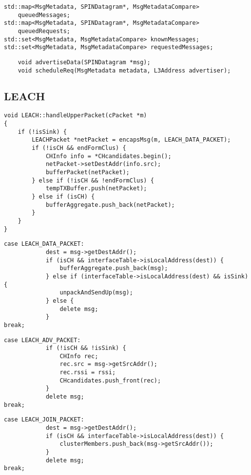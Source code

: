 \begin{verbatim}
std::map<MsgMetadata, SPINDatagram*, MsgMetadataCompare> 
    queuedMessages;
std::map<MsgMetadata, SPINDatagram*, MsgMetadataCompare> 
    queuedRequests;
std::set<MsgMetadata, MsgMetadataCompare> knownMessages;
std::set<MsgMetadata, MsgMetadataCompare> requestedMessages;
\end{verbatim}

\begin{verbatim}
    void advertiseData(SPINDatagram *msg);
    void scheduleReq(MsgMetadata metadata, L3Address advertiser);
\end{verbatim}
\subsection{LEACH}
\begin{verbatim}
void LEACH::handleUpperPacket(cPacket *m)
{
    if (!isSink) {
        LEACHPacket *netPacket = encapsMsg(m, LEACH_DATA_PACKET);
        if (!isCH && endFormClus) {
            CHInfo info = *CHcandidates.begin();
            netPacket->setDestAddr(info.src);
            bufferPacket(netPacket);
        } else if (!isCH && !endFormClus) {
            tempTXBuffer.push(netPacket);
        } else if (isCH) {
            bufferAggregate.push_back(netPacket);
        }
    }
}
\end{verbatim}

\begin{verbatim}
case LEACH_DATA_PACKET:
            dest = msg->getDestAddr();
            if (isCH && interfaceTable->isLocalAddress(dest)) {
                bufferAggregate.push_back(msg);
            } else if (interfaceTable->isLocalAddress(dest) && isSink) {
                unpackAndSendUp(msg);
            } else {
                delete msg;
            }
break;
\end{verbatim}

\begin{verbatim}
case LEACH_ADV_PACKET:
            if (!isCH && !isSink) {
                CHInfo rec;
                rec.src = msg->getSrcAddr();
                rec.rssi = rssi;
                CHcandidates.push_front(rec);
            }
            delete msg;
break;
\end{verbatim}

\begin{verbatim}
case LEACH_JOIN_PACKET:
            dest = msg->getDestAddr();
            if (isCH && interfaceTable->isLocalAddress(dest)) {
                clusterMembers.push_back(msg->getSrcAddr());
            }
            delete msg;
break;
\end{verbatim}

